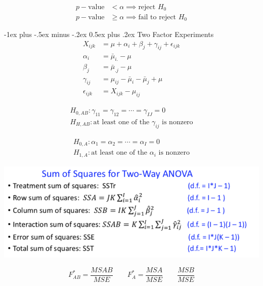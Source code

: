 \documentclass[9pt,landscape]{memoir}
\makeatletter
\renewcommand{\section}{\@startsection{section}{1}{0mm}%
    {-1ex plus -.5ex minus -.2ex}%
    {0.5ex plus .2ex}%
{\normalfont\large\bfseries}}
\makeatother
\begin{document}
\begin{multicols}{3}
            \begin{align*}
                p-\text{value} &< \alpha \implies \text{reject $H_0$} \\
                p-\text{value} &\geq \alpha \implies \text{fail to reject $H_0$}
            \end{align*}

    \section{Two Factor Experiments}
            \begin{align*}
                X_{ijk}        &= \mu + \alpha_i + \beta_j + \gamma_{ij} + \epsilon_{ijk} \\
                \alpha_i       &= \bar{\mu}_{i.} - \mu \\
                \beta_j        &= \bar{\mu}_{.j} - \mu \\
                \gamma_{ij}    &= \mu_{ij} - \bar{\mu}_i - \bar{\mu}_j + \mu \\
                \epsilon_{ijk} &= X_{ijk} - \mu_{ij}
            \end{align*}

            \begin{align*}
                H_{0, AB}: \gamma_{11} = \gamma_{12} = \cdots = \gamma_{IJ} = 0 \\
                H_{H, AB}: \text{at least one of the $\gamma_{ij}$ is nonzero}
            \end{align*}

            \begin{align*}
                H_{0, A}: \alpha_1 = \alpha_2 = \cdots = \alpha_I = 0 \\
                H_{1, A}: \text{at least one of the $\alpha_i$ is nonzero}
            \end{align*}

    \includegraphics[width=.9\columnwidth]{degrees}

    \begin{equation*}
        F_{AB}^* = \frac{MSAB}{MSE} \qquad F_A ^* = \frac{MSA}{MSE} \qquad \frac{MSB}{MSE}
    \end{equation*}


\end{multicols}
\end{document}
